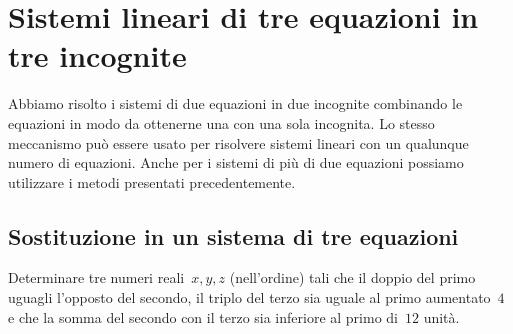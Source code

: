 \section{Sistemi lineari di tre equazioni in tre incognite}
\label{sec:compl1_sistemitreeq}

Abbiamo risolto i sistemi di due equazioni in due incognite combinando le 
equazioni in modo da ottenerne una con una sola incognita.
Lo stesso meccanismo può essere usato per risolvere sistemi lineari con un 
qualunque numero di equazioni.
Anche per i sistemi di più di due equazioni possiamo utilizzare i metodi 
presentati precedentemente.

\subsection{Sostituzione in un sistema di tre equazioni}

\begin{problema}
Determinare tre numeri reali~\(x, y, z\) (nell'ordine) tali
che il doppio del primo uguagli l'opposto del secondo,
il triplo del terzo sia uguale al primo aumentato~\(4\)
e che la somma del secondo con il terzo sia inferiore al primo di~\(12\) 
unità.
\end{problema}

